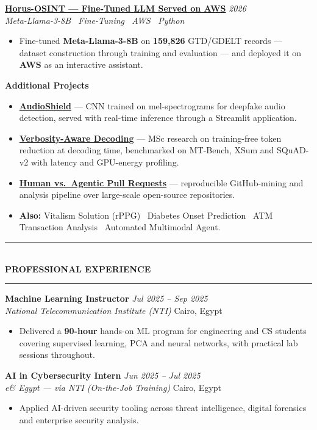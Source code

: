 \documentclass[10pt, a4paper]{article}
\newcommand{\cvsection}[1]{%
  \vspace{3pt}%
  {\color{navy}\rule{\linewidth}{1.1pt}}\\[0.5pt]%
  {\color{navy}\bfseries\fontsize{9.5}{11}\selectfont\uppercase{#1}}\\[-4pt]%
  {\color{teal}\rule{\linewidth}{0.6pt}}%
  \vspace{2pt}%
}
\newcommand{\cventry}[4]{%
  \vspace{2.5pt}%
  \textbf{\color{darkgray}#1} \hfill {\color{midgray}\textit{#3}}\\[-1.5pt]%
  {\color{teal}\textit{#2}} \hfill {\color{midgray}#4}%
}
\newcommand{\cvproject}[3]{%
  \vspace{2.5pt}%
  {\bfseries\color{navy}#1} \hfill {\color{midgray}\textit{#3}}\\[-1.5pt]%
  {\color{teal}\textit{#2}}%
}
\newcommand{\cvmini}[2]{\item {\bfseries\color{navy}#1} --- #2}
\newenvironment{cvitems}{%
  \begin{itemize}[leftmargin=11pt, itemsep=0.5pt, parsep=0pt, topsep=1pt,
                  label={\textcolor{teal}{$\bullet$}}]
}{%
  \end{itemize}%
}
\begin{document}
\cvproject{\href{https://github.com/MahmoudAlyosify/Horus-OSINT}{Horus-OSINT --- Fine-Tuned LLM Served on AWS}}
          {Meta-Llama-3-8B \textperiodcentered\ Fine-Tuning \textperiodcentered\ AWS \textperiodcentered\ Python}
          {2026}
\begin{cvitems}
  \item Fine-tuned \textbf{Meta-Llama-3-8B} on \textbf{159,826} GTD/GDELT records --- dataset construction through training and evaluation --- and deployed it on \textbf{AWS} as an interactive assistant.
\end{cvitems}

\vspace{3pt}
{\bfseries\color{navy}Additional Projects}
\begin{cvitems}
  \cvmini{\href{https://github.com/MahmoudAlyosify/AudioShield}{AudioShield}}{CNN trained on mel-spectrograms for deepfake audio detection, served with real-time inference through a Streamlit application.}
  \cvmini{\href{https://github.com/MahmoudAlyosify/minimal-lm}{Verbosity-Aware Decoding}}{MSc research on training-free token reduction at decoding time, benchmarked on MT-Bench, XSum and SQuAD-v2 with latency and GPU-energy profiling.}
  \cvmini{\href{https://github.com/MahmoudAlyosify/Analyzing-Review-Effort-in-Human-vs.-Agentic-Pull-Requests}{Human vs.\ Agentic Pull Requests}}{reproducible GitHub-mining and analysis pipeline over large-scale open-source repositories.}
  \item \textbf{Also:} Vitalism Solution (rPPG) \textperiodcentered\ Diabetes Onset Prediction \textperiodcentered\ ATM Transaction Analysis \textperiodcentered\ Automated Multimodal Agent.
\end{cvitems}

\cvsection{Professional Experience}

\cventry{Machine Learning Instructor}{National Telecommunication Institute (NTI)}
        {Jul 2025 -- Sep 2025}{Cairo, Egypt}
\begin{cvitems}
  \item Delivered a \textbf{90-hour} hands-on ML program for engineering and CS students covering supervised learning, PCA and neural networks, with practical lab sessions throughout.
\end{cvitems}

\cventry{AI in Cybersecurity Intern}{e\& Egypt --- via NTI (On-the-Job Training)}
        {Jun 2025 -- Jul 2025}{Cairo, Egypt}
\begin{cvitems}
  \item Applied AI-driven security tooling across threat intelligence, digital forensics and enterprise security analysis.
\end{cvitems}
\end{document}
